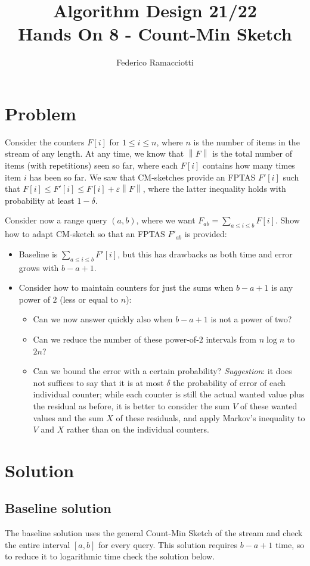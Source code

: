 \documentclass{article}
\title{\LARGE{\textbf{Algorithm Design 21/22}}\\ \vspace{1cm} Hands On 8 - Count-Min Sketch}
\author{Federico Ramacciotti}
\date{}
\begin{document}
\maketitle

\section{Problem}
Consider the counters $F[i]$ for $1 \leq i \leq n$, where $n$ is the number of items in the stream of any length. At any time, we know that $\left \|F\right\| $ is the total number of items (with repetitions) seen so far, where each $F[i]$ contains how many times item $i$ has been so far. We saw that CM-sketches provide an FPTAS $F'[i]$ such that $F[i] \leq F'[i] \leq F[i] + \varepsilon \left \|F\right\| $, where the latter inequality holds with probability at least $1 - \delta$.

Consider now a range query $(a,b)$, where we want $F_{ab} =\sum_{a \leq i \leq b} F[i]$. Show how to adapt CM-sketch so that an FPTAS $F'_{ab}$ is provided:
\begin{itemize}
    \item Baseline is $\sum_{a \leq i \leq b} F'[i]$, but this has drawbacks as both time and error grows with $b-a+1$.
    \item Consider how to maintain counters for just the sums when $b-a+1$ is any power of $2$ (less or equal to $n$):
    \begin{itemize}
        \item Can we now answer quickly also when $b-a+1$ is not a power of two?
	    \item Can we reduce the number of these power-of-$2$ intervals from $n \log n$ to $2n$?
	    \item Can we bound the error with a certain probability? \textit{Suggestion}: it does not suffices to say that it is at most $\delta$ the probability of error of each individual counter; while each counter is still the actual wanted value plus the residual as before, it is better to consider the sum $V$ of these wanted values and the sum $X$ of these residuals, and apply Markov’s inequality to $V$ and $X$ rather than on the individual counters.
    \end{itemize}
\end{itemize}

\section{Solution}
\subsection{Baseline solution}
The baseline solution uses the general Count-Min Sketch of the stream and check the entire interval $[a,b]$ for every query. This solution requires $b-a+1$ time, so to reduce it to logarithmic time check the solution below.
\end{document}
